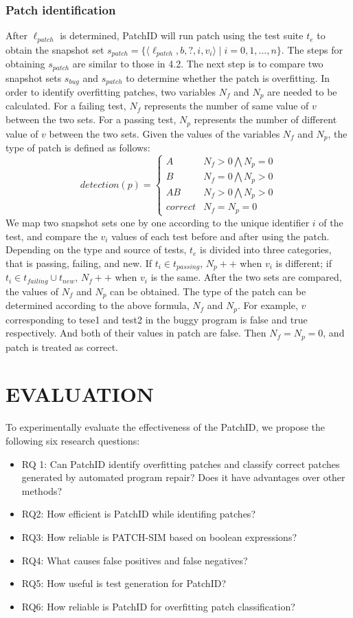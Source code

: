 \documentclass[sn-basic]{sn-jnl}
\theoremstyle{thmstyleone}
\theoremstyle{thmstyletwo}
\theoremstyle{thmstylethree}
\begin{document}
\subsubsection{Patch identification}
After $\ell_{patch}$ is determined, PatchID will run patch using the test suite $t_e$ to obtain the snapshot set $s_{patch}= \{ \langle \ell_{patch},b,?,i,v_i \rangle \mid i=0,1,\dots,n \}$. The steps for obtaining $s_{patch}$ are similar to those in 4.2. The next step is to compare two snapshot sets $s_{bug}$ and $s_{patch}$ to determine whether the patch is overfitting.
In order to identify overfitting patches, two variables $N_f$ and $N_p$ are needed to be calculated. For a failing test, $N_f$ represents the number of same value of $v$ between the two sets. For a passing test, $N_p$ represents the number of different value of $v$ between the two sets. Given the values of the variables $N_f$ and $N_p$, the type of patch is defined as follows:
\begin{equation}
	detection(p)= \begin{cases} A& N_f>0\bigwedge N_p = 0\\ B& N_f=0\bigwedge N_p>0\\
		AB& N_f>0\bigwedge N_p>0\\ correct& N_f = N_p = 0\end{cases}
\end{equation}
We map two snapshot sets one by one according to the unique identifier $i$ of the test, and compare the $v_i$ values of each test before and after using the patch. Depending on the type and source of tests, $t_e$ is divided into three categories, that is passing, failing, and new. If $t_i \in t_{passing}$, $N_p++$ when $v_i$ is different; if $t_i \in t_{failing} \cup t_{new}$, $N_f++$ when $v_i$ is the same. After the two sets are compared, the values of $N_f$ and $N_p$ can be obtained. The type of the patch can be determined according to the above formula, $N_f$ and $N_p$.
For example, $v$ corresponding to tese1 and test2 in the buggy program is false and true respectively. And both of their values in patch are false. Then $N_f = N_p = 0$, and patch is treated as correct.

\section{EVALUATION}\label{sec5}
To experimentally evaluate the effectiveness of the PatchID, we propose the following six research questions:
\begin{itemize}
	\item RQ 1: Can PatchID identify overfitting patches and classify correct patches generated by automated program repair? Does it have advantages over other methods?
	\item RQ2: How efficient is PatchID while identifing patches?
	\item RQ3: How reliable is PATCH-SIM based on boolean expressions?
	\item RQ4: What causes false positives and false negatives?
	\item RQ5: How useful is test generation for PatchID?
	\item RQ6: How reliable is PatchID for overfitting patch classification?
\end{itemize}
\end{document}
